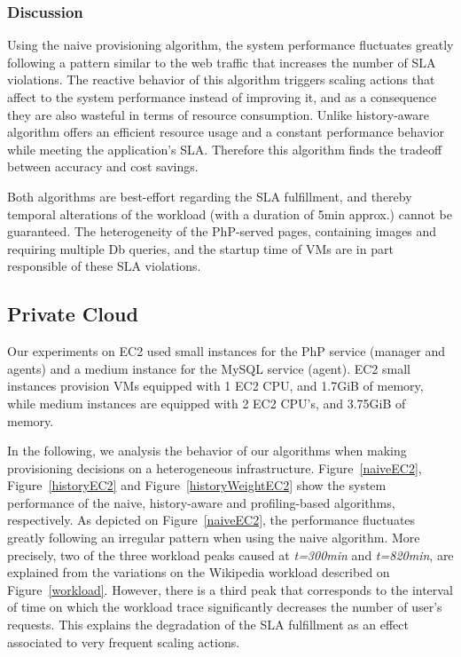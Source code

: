 \subsubsection{Discussion}

Using the naive provisioning algorithm, the system performance fluctuates greatly following a pattern similar to the web traffic that increases the number of SLA violations. The reactive behavior of this algorithm triggers scaling actions that affect to the system performance instead of improving it, and as a consequence they are also wasteful in terms of resource consumption. Unlike history-aware algorithm offers an efficient resource usage and a constant performance behavior while meeting the application's SLA. Therefore this algorithm finds the tradeoff between accuracy and cost savings.

Both algorithms are best-effort regarding the SLA fulfillment, and thereby temporal alterations of the workload (with a duration of 5min approx.) cannot be guaranteed. The heterogeneity of the PhP-served pages, containing images and requiring multiple Db queries, and the startup time of VMs are in part responsible of these SLA violations. 




\subsection{Private Cloud}

Our experiments on EC2 used small instances for the PhP service (manager and agents) and  a medium instance for the MySQL service (agent). EC2 small instances provision VMs equipped with 1 EC2 CPU, and 1.7GiB of memory, while medium instances are equipped with 2 EC2 CPU's, and 3.75GiB of memory.

In the following, we analysis the behavior of our algorithms when making provisioning decisions on a heterogeneous infrastructure. Figure~\ref{naiveEC2}, Figure~\ref{historyEC2} and Figure~\ref{historyWeightEC2} show the system performance of the naive, history-aware and profiling-based algorithms, respectively. As depicted on Figure~\ref{naiveEC2}, the performance fluctuates greatly following an irregular pattern when using the naive algorithm. More precisely, two of the three workload peaks caused at \emph{t=300min} and \emph{t=820min}, are explained from the variations on the Wikipedia workload described on Figure~\ref{workload}. However, there is a third peak that corresponds to the interval of time on which the workload trace significantly decreases the number of user's requests. This explains the degradation of the SLA fulfillment as an effect associated to very frequent scaling actions. 

